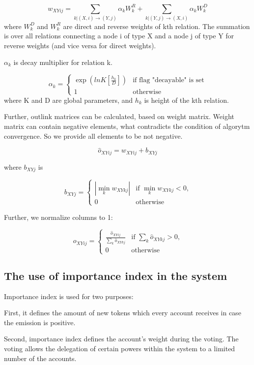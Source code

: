 \documentclass[a4paper,12pt]{article}
\begin{document}
$$
    w_{XYij} = \sum_{k|(X,i) \to (Y,j)} \alpha_k W^R_k + \sum_{k|(Y,j) \to (X,i)} \alpha_k W^D_k
$$
where $W^D_k$ and $W^R_k$ are direct and reverse weights of kth relation. The summation is over all relations connecting a node i of type X and a node j of type Y for reverse weights (and vice versa for direct weights).

$\alpha_k$ is decay multiplier for relation k. 

$$
\alpha_k = \begin{cases}
 \exp{(lnK [\frac{h_k}{D}])}
 & \text{if flag "decayable" is set}\\
 1 & \text{otherwise}
\end{cases} 
$$
where K and D are global parameters, and $h_k$ is height of the kth relation.

Further, outlink matrices can be calculated, based on weight matrix. Weight matrix can contain negative elements, what contradicts the condition of algorytm convergence. So we provide all elements to be not negative.

$$
\hat{o}_{XYij} = w_{XYij} + b_{XYj}
$$

where $b_{XYj}$ is

$$
b_{XYj} = \begin{cases}
 |\min_k w_{XYkj}|
 & \text {if $\min_k w_{XYkj} < 0$,}\\
 0 & \text{otherwise}
\end{cases} 
$$

Further, we normalize columns to 1:

$$
o_{XYij} = \begin{cases}
 \frac{\hat{o}_{XYij}} {\sum\limits_{k} \hat{o}_{XYkj}}
 & \text{if $\sum\limits_{k} \hat{o}_{XYkj}> 0$,}\\
 0 & \text{otherwise}
\end{cases} 
$$


\subsection{The use of importance index in the system}

Importance index is used for two purposes:

First, it defines the amount of new tokens which every account receives in case the emission is positive. 

Second, importance index defines the account’s weight during the voting. The voting allows the delegation  of certain powers within the system to a limited number of the accounts. 
\end{document}
